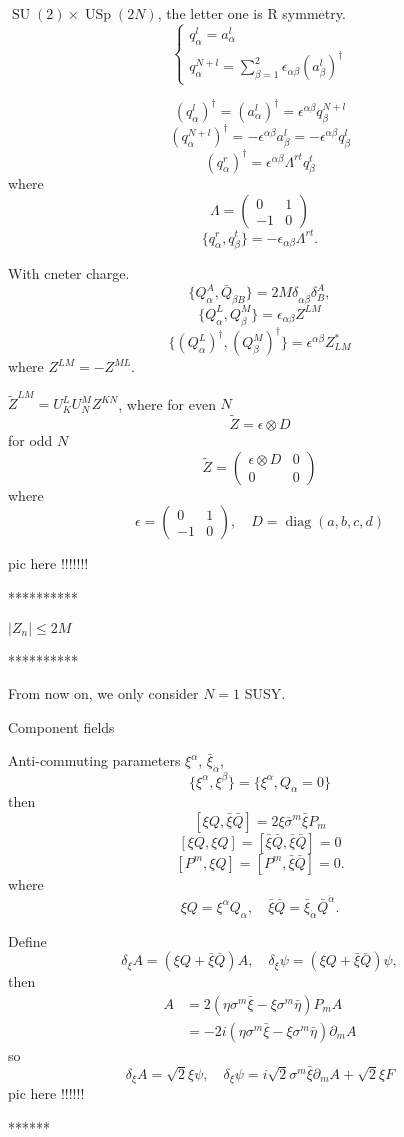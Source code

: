 \documentclass[11pt]{article}
\theoremstyle{definition}
\theoremstyle{plain}
\begin{document}
$\operatorname{SU}(2)\times \operatorname{USp}(2N)$, the letter one
is R symmetry.
\[
	\begin{cases}
	q_\alpha^l=a_\alpha^l\\
	q_\alpha^{N+l}=\sum_{\beta=1}^2\epsilon_{\alpha\beta}(a_\beta^l)^\dagger
	\end{cases}
\]

\[
	(q_\alpha^l)^\dagger =(a_\alpha^l)^\dagger = \epsilon^{\alpha\beta}q_\beta^{N+l}
\]
\[
	(q_\alpha^{N+l})^\dagger = - \epsilon^{\alpha\beta}a_\beta^l
	= - \epsilon^{\alpha\beta}q_{\beta}^l
\]
\[
	(q_\alpha^r)^\dagger =\epsilon^{\alpha\beta}\Lambda^{rt}q^t_\beta
\]
where 
\[
	\Lambda = \begin{pmatrix}
		0&1\\-1&0
	\end{pmatrix}
\]
\[
	\{q_\alpha^r,q_\beta^t\}=-\epsilon_{\alpha\beta}\Lambda^{rt}.
\]

With cneter charge. 
\[
	\{Q_\alpha^A,\bar Q_{\dot\beta B}\}=2M \delta_{\alpha\dot \beta}\delta^A_B,
\]
\[
	\{Q_\alpha^L,Q_\beta^M\}=\epsilon_{\alpha\beta}Z^{LM}
\]
\[
	\{(Q_\alpha^L)^\dagger,(Q_\beta^M)^\dagger\}=\epsilon^{\alpha\beta}Z^*_{LM}
\]
where $Z^{LM}=-Z^{ML}$.

$\tilde Z^{LM}=U^L_K U^M_N Z^{KN}$, where for even $N$
\[
	\tilde Z=\epsilon \otimes D
\]
for odd $N$
\[
	\tilde Z=\begin{pmatrix}
	\epsilon \otimes D&0\\
	0&0
	\end{pmatrix}
\]
where 
\[
	\epsilon=\begin{pmatrix}
	0&1\\
	-1&0
	\end{pmatrix},\quad
	D=\operatorname{diag}(a,b,c,d)
\]

pic here !!!!!!!

**********

$|Z_n|\leq 2M$

**********

From now on, we only consider $N=1$ SUSY.

Component fields 

Anti-commuting parameters $\xi^\alpha$, $\bar \xi_{\dot \alpha}$,
\[
	\{\xi^\alpha,\xi^\beta\}=\{\xi^\alpha,Q_\alpha=0\}
\]
then
\[
	[\xi Q,\bar \xi \bar Q]=2\xi \bar\sigma^m\bar \xi P_m
\]
\[
	[\xi Q,\xi Q]=[\bar \xi \bar Q,\bar \xi \bar Q]=0
\]
\[
	[P^m,\xi Q]=[P^m,\bar \xi \bar Q]=0.
\]
where 
\[
	\xi Q=\xi^\alpha Q_\alpha,\quad \bar \xi \bar Q=\bar \xi_{\dot \alpha}\bar Q^{\dot \alpha}.
\]

Define
\[
	\delta_\xi A=(\xi Q+\bar \xi \bar Q)A,\quad \delta_\xi \psi
	=(\xi Q+\bar \xi \bar Q)\psi,
\]
then
\begin{align*}
	[\delta_\eta,\delta_\xi]A&=2(\eta\sigma^m \bar \xi -\xi\sigma^m \bar \eta)
	P_m A\\
	&=-2i(\eta\sigma^m \bar \xi-\xi \sigma^m\bar\eta)\partial_m A
\end{align*}
so
\[
	\delta_\xi A=\sqrt 2 \xi \psi,\quad \delta_\xi \psi=i\sqrt 2 \sigma^m \bar \xi \partial_m A+\sqrt{2}\xi F
\]
pic here !!!!!!

******
\end{document}
